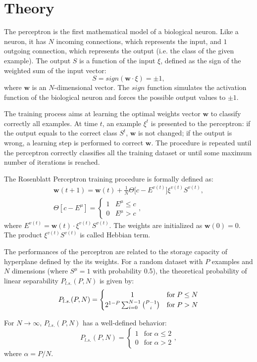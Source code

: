\section{Theory}
\label{sec:fundamentals}

The perceptron is the first mathematical model of a biological neuron.
Like a neuron, it has $N$ incoming connections, which represents the input, and $1$ outgoing connection, which represents the output (i.e. the class of the given example).
The output $S$ is a function of the input $\xi$, defined as the sign of the weighted sum of the input vector:
\begin{equation}
    S = sign(\mathsf{\bm{w}} \cdotp \xi) = \pm 1,
    \label{eq:perceptron-activation}
\end{equation}
where $\mathsf{\bm{w}}$ is an $N$-dimensional vector.
The $sign$ function simulates the activation function of the biological neuron and forces the possible output values to $\pm 1$.

The training process aims at learning the optimal weights vector $\mathsf{\bm{w}}$ to classify correctly all examples.
At time $t$, an example $\xi^t$ is presented to the perceptron:
if the output equals to the correct class $S^t$, $\mathsf{\bm{w}}$ is not changed;
if the output is wrong, a learning step is performed to correct $\mathsf{\bm{w}}$.
The procedure is repeated until the perceptron correctly classifies all the training dataset or until some maximum number of iterations is reached.

The Rosenblatt Perceptron training procedure is formally defined as:
\begin{gather}
    \label{eq:perceptron-weight-update}
    \mathsf{\bm{w}}(t+1) = \mathsf{\bm{w}}(t) + \frac{1}{N} \Theta \big[c - E^{v(t)}\big] \xi^{v(t)} S^{v(t)}, \\
    \Theta[c - E^{\mu}] =  \begin{cases} \label{eq:heaviside-fun}
        1 & E^{\mu} \leq c \\
        0 & E^{\mu} > c
    \end{cases},
\end{gather}
where $E^{v(t)} = \mathsf{\bm{w}}(t) \cdot \xi^{v(t)} S^{v(t)}$.
The weights are initialized as $\mathsf{\bm{w}}(0) = 0$.
The product $\xi^{v(t)} S^{v(t)}$ is called Hebbian term.

The performances of the perceptron are related to the storage capacity of hyperplane defined by the its weights.
For a random dataset with $P$ examples and $N$ dimensions (where $S^\mu = 1$ with probability 0.5), the theoretical probability of linear separability $P_{l.s.}(P,N)$ is given by:
\begin{equation}
    P_{l.s.}(P,N) =
    \begin{cases}
        \hfil 1 & \text{for} \; P \leq N \\
        2^{1-P} \sum^{N-1}_{i=0} \binom{P - 1}{i} & \text{for} \; P > N       
    \end{cases}
    \label{eq:prob-lin-sep}
\end{equation}

For $N \rightarrow \infty$, $P_{l.s.}(P,N)$ has a well-defined behavior:
\begin{equation} \label{eq:prob-lin-sep-alpha}
    P_{l.s.}(P,N) =
    \begin{cases}
        1 & \text{for} \; \alpha \leq 2 \\
        0 & \text{for} \; \alpha > 2
    \end{cases},
\end{equation}
where $\alpha = P / N$.
